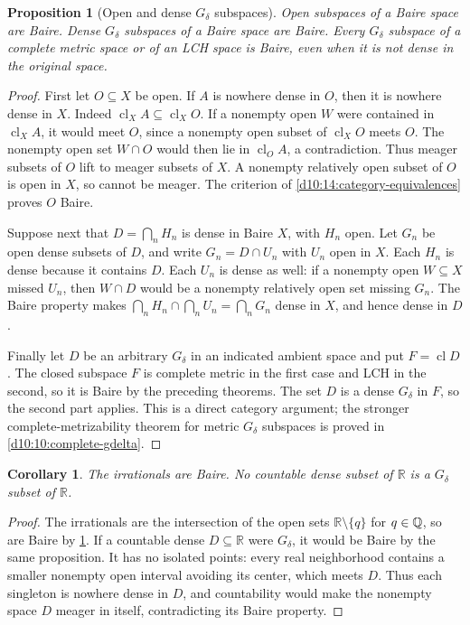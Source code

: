 \documentclass[11pt,oneside,openany]{book}
\newtheorem{proposition}[theorem]{Proposition}
\newtheorem{corollary}[theorem]{Corollary}
\theoremstyle{definition}
\theoremstyle{remark}
\newcommand{\R}{\mathbb R}\newcommand{\C}{\mathbb C}
\DeclareMathOperator{\cl}{cl}
\begin{document}
\begin{proposition}[Open and dense $G_\delta$ subspaces]\label{d10:14:baire-subspaces}
Open subspaces of a Baire space are Baire. Dense $G_\delta$ subspaces of a Baire space are Baire. Every $G_\delta$ subspace of a complete metric space or of an LCH space is Baire, even when it is not dense in the original space.
\end{proposition}
\begin{proof}
First let $O\subseteq X$ be open. If $A$ is nowhere dense in $O$, then it is nowhere dense in $X$. Indeed $\cl_XA\subseteq\cl_XO$. If a nonempty open $W$ were contained in $\cl_XA$, it would meet $O$, since a nonempty open subset of $\cl_XO$ meets $O$. The nonempty open set $W\cap O$ would then lie in $\cl_OA$, a contradiction. Thus meager subsets of $O$ lift to meager subsets of $X$. A nonempty relatively open subset of $O$ is open in $X$, so cannot be meager. The criterion of \cref{d10:14:category-equivalences} proves $O$ Baire.

Suppose next that $D=\bigcap_nH_n$ is dense in Baire $X$, with $H_n$ open. Let $G_n$ be open dense subsets of $D$, and write $G_n=D\cap U_n$ with $U_n$ open in $X$. Each $H_n$ is dense because it contains $D$. Each $U_n$ is dense as well: if a nonempty open $W\subseteq X$ missed $U_n$, then $W\cap D$ would be a nonempty relatively open set missing $G_n$. The Baire property makes $\bigcap_nH_n\cap\bigcap_nU_n=\bigcap_nG_n$ dense in $X$, and hence dense in $D$.

Finally let $D$ be an arbitrary $G_\delta$ in an indicated ambient space and put $F=\cl D$. The closed subspace $F$ is complete metric in the first case and LCH in the second, so it is Baire by the preceding theorems. The set $D$ is a dense $G_\delta$ in $F$, so the second part applies. This is a direct category argument; the stronger complete-metrizability theorem for metric $G_\delta$ subspaces is proved in \cref{d10:10:complete-gdelta}.
\end{proof}

\begin{corollary}\label{d10:14:countable-dense}
The irrationals are Baire. No countable dense subset of $\R$ is a $G_\delta$ subset of $\R$.
\end{corollary}
\begin{proof}
The irrationals are the intersection of the open sets $\R\setminus\{q\}$ for $q\in\mathbb Q$, so are Baire by \cref{d10:14:baire-subspaces}. If a countable dense $D\subseteq\R$ were $G_\delta$, it would be Baire by the same proposition. It has no isolated points: every real neighborhood contains a smaller nonempty open interval avoiding its center, which meets $D$. Thus each singleton is nowhere dense in $D$, and countability would make the nonempty space $D$ meager in itself, contradicting its Baire property.
\end{proof}
\end{document}
